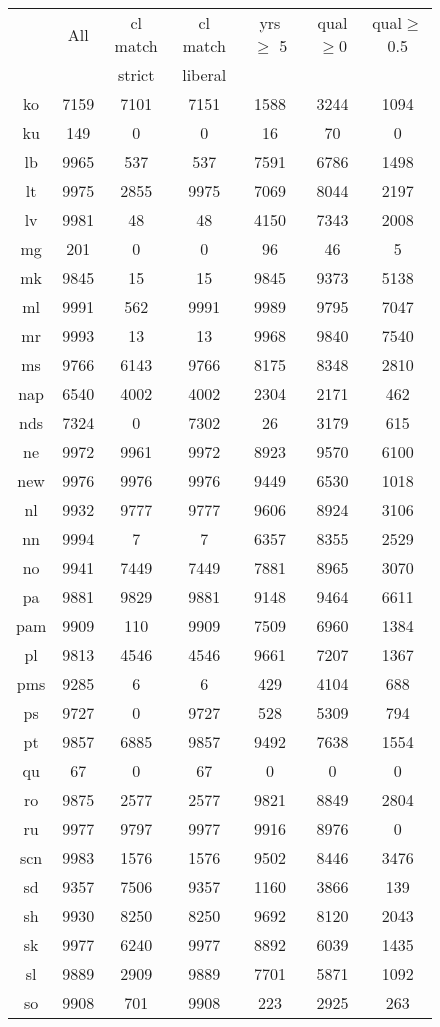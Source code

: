 \begin{figure}[h]
\centering
\begin{tabular}{ccccccc}
&All&cl match&cl match&yrs $\geq$ 5&qual$\geq$0&qual$\geq$0.5\\
&&strict&liberal&&&\\\hline\hline
ko&7159&7101&7151&1588&3244&1094\\
ku&149&0&0&16&70&0\\
lb&9965&537&537&7591&6786&1498\\
lt&9975&2855&9975&7069&8044&2197\\
lv&9981&48&48&4150&7343&2008\\
mg&201&0&0&96&46&5\\
mk&9845&15&15&9845&9373&5138\\
ml&9991&562&9991&9989&9795&7047\\
mr&9993&13&13&9968&9840&7540\\
ms&9766&6143&9766&8175&8348&2810\\
nap&6540&4002&4002&2304&2171&462\\
nds&7324&0&7302&26&3179&615\\
ne&9972&9961&9972&8923&9570&6100\\
new&9976&9976&9976&9449&6530&1018\\
nl&9932&9777&9777&9606&8924&3106\\
nn&9994&7&7&6357&8355&2529\\
no&9941&7449&7449&7881&8965&3070\\
pa&9881&9829&9881&9148&9464&6611\\
pam&9909&110&9909&7509&6960&1384\\
pl&9813&4546&4546&9661&7207&1367\\
pms&9285&6&6&429&4104&688\\
ps&9727&0&9727&528&5309&794\\
pt&9857&6885&9857&9492&7638&1554\\
qu&67&0&67&0&0&0\\
ro&9875&2577&2577&9821&8849&2804\\
ru&9977&9797&9977&9916&8976&0\\
scn&9983&1576&1576&9502&8446&3476\\
sd&9357&7506&9357&1160&3866&139\\
sh&9930&8250&8250&9692&8120&2043\\
sk&9977&6240&9977&8892&6039&1435\\
sl&9889&2909&9889&7701&5871&1092\\
so&9908&701&9908&223&2925&263\\

\end{tabular}
\end{figure}
